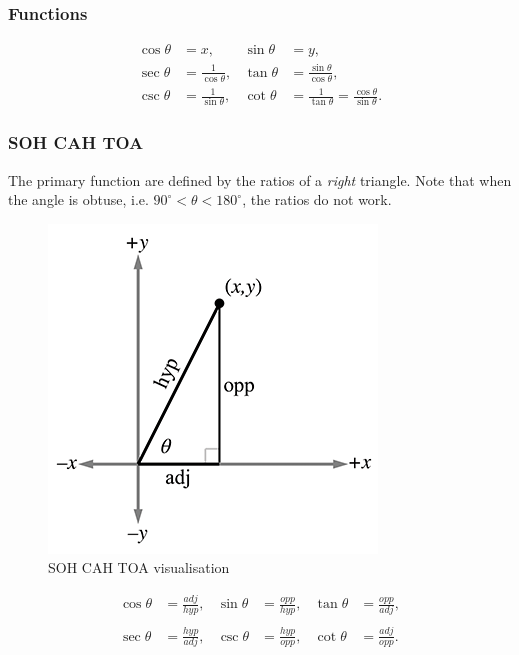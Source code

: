 \documentclass[11pt]{article}
\begin{document}
\subsubsection{Functions}

\begin{align*}
\cos\theta &=x, &\sin\theta &=y, \\
\sec\theta &=\frac{1}{\cos\theta}, &\tan\theta &=\frac{\sin\theta}{\cos\theta}, \\
\csc\theta &=\frac{1}{\sin\theta}, &\cot\theta &=\frac{1}{\tan\theta}=\frac{\cos\theta}{\sin\theta}.
\end{align*}

\subsubsection{SOH CAH TOA}

The primary function are defined by the ratios of a \emph{right} triangle. Note that when the angle is obtuse, i.e. $90^\circ < \theta < 180^\circ$, the ratios do not work.

\begin{figure}[H]
\centering
    \includegraphics{01_sohcahtoa}
\caption{SOH CAH TOA visualisation}
\label{fig:soh-cah-toa-visualization}
\end{figure}

\[\begin{matrix}
{\cos\theta} & {= \frac{\mathit{a}\mathit{d}\mathit{j}}{\mathit{h}\mathit{y}\mathit{p}},} & {\sin\theta} & {= \frac{\mathit{o}\mathit{p}\mathit{p}}{\mathit{h}\mathit{y}\mathit{p}},} & {\tan\theta} & {= \frac{\mathit{o}\mathit{p}\mathit{p}}{\mathit{a}\mathit{d}\mathit{j}},} \\
 & & & & & \\
{\sec\theta} & {= \frac{\mathit{h}\mathit{y}\mathit{p}}{\mathit{a}\mathit{d}\mathit{j}},} & {\csc\theta} & {= \frac{\mathit{h}\mathit{y}\mathit{p}}{\mathit{o}\mathit{p}\mathit{p}},} & {\cot\theta} & {= \frac{\mathit{a}\mathit{d}\mathit{j}}{\mathit{o}\mathit{p}\mathit{p}}.} \\
\end{matrix}\]
\end{document}
